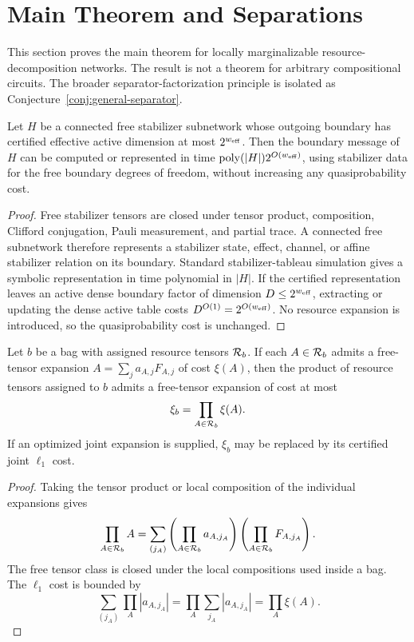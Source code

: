 \section{Main Theorem and Separations}
\label{sec:main-theorem}

This section proves the main theorem for locally marginalizable resource-decomposition networks. The result is not a theorem for arbitrary compositional circuits. The broader separator-factorization principle is isolated as Conjecture~\ref{conj:general-separator}.

\begin{theorem}
\label{thm:free-compression}
Let \(H\) be a connected free stabilizer subnetwork whose outgoing boundary has certified effective active dimension at most \(2^{w_{\mathrm{eff}}}\). Then the boundary message of \(H\) can be computed or represented in time \(\operatorname{poly}(|H|)2^{O(w_{\mathrm{eff}})}\), using stabilizer data for the free boundary degrees of freedom, without increasing any quasiprobability cost.
\end{theorem}

\begin{proof}
Free stabilizer tensors are closed under tensor product, composition, Clifford conjugation, Pauli measurement, and partial trace. A connected free subnetwork therefore represents a stabilizer state, effect, channel, or affine stabilizer relation on its boundary. Standard stabilizer-tableau simulation gives a symbolic representation in time polynomial in \(|H|\). If the certified representation leaves an active dense boundary factor of dimension \(D\le 2^{w_{\mathrm{eff}}}\), extracting or updating the dense active table costs \(D^{O(1)}=\allowbreak 2^{O(w_{\mathrm{eff}})}\). No resource expansion is introduced, so the quasiprobability cost is unchanged.
\end{proof}

\begin{lemma}
\label{lem:bag-expansion}
Let \(b\) be a bag with assigned resource tensors \(\mathcal{R}_b\). If each \(A\in\mathcal{R}_b\) admits a free-tensor expansion \(A=\sum_j a_{A,j}F_{A,j}\) of cost \(\xi(A)\), then the product of resource tensors assigned to \(b\) admits a free-tensor expansion of cost at most
\[
\xi_b=\prod_{A\in\mathcal{R}_b}\xi(A).
\]
If an optimized joint expansion is supplied, \(\xi_b\) may be replaced by its certified joint \(\ell_1\) cost.
\end{lemma}

\begin{proof}
Taking the tensor product or local composition of the individual expansions gives
\[
\prod_{A\in\mathcal{R}_b}A
=\sum_{(j_A)}
\left(\prod_{A\in\mathcal{R}_b}a_{A,j_A}\right)
\left(\prod_{A\in\mathcal{R}_b}F_{A,j_A}\right).
\]
The free tensor class is closed under the local compositions used inside a bag. The \(\ell_1\) cost is bounded by
\[
\sum_{(j_A)}\prod_A |a_{A,j_A}|
=\prod_A\sum_{j_A}|a_{A,j_A}|
=\prod_A\xi(A).
\]
\end{proof}

